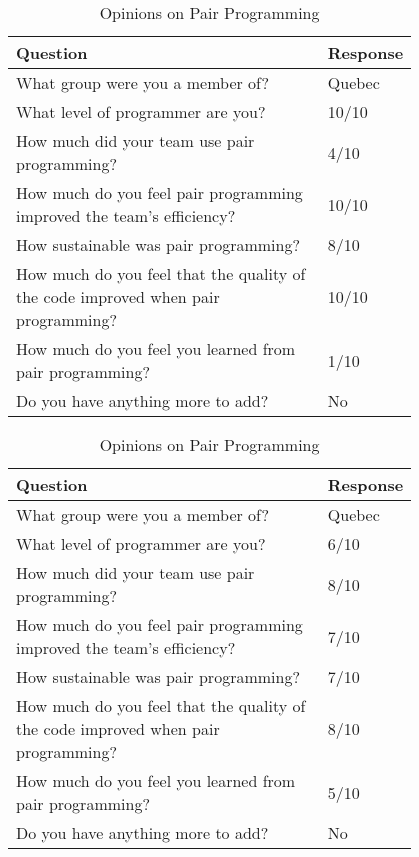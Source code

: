 \documentclass{article}
\begin{document}
\begin{table}[ht]
\centering
\renewcommand{\arraystretch}{1.3}
\caption{Opinions on Pair Programming}
\begin{tabular}{|p{0.8\linewidth}|l|}
\hline
\textbf{Question} & \textbf{Response} \\
\hline
What group were you a member of? & Quebec \\
\hline 
What level of programmer are you? & 10/10\\
\hline 
How much did your team use pair programming? & 4/10\\
\hline 
How much do you feel pair programming improved the team's efficiency? & 10/10\\
\hline 
How sustainable was pair programming? & 8/10\\
\hline 
How much do you feel that the quality of the code improved when pair programming? & 10/10\\
\hline 
How much do you feel you learned from pair programming? & 1/10\\
\hline 
Do you have anything more to add? &  No\\
\hline
\end{tabular}
\end{table}

\begin{table}[ht]
\centering
\renewcommand{\arraystretch}{1.3}
\caption{Opinions on Pair Programming}
\begin{tabular}{|p{0.8\linewidth}|l|}
\hline
\textbf{Question} & \textbf{Response} \\
\hline
What group were you a member of? & Quebec \\
\hline 
What level of programmer are you? & 6/10\\
\hline 
How much did your team use pair programming? & 8/10\\
\hline 
How much do you feel pair programming improved the team's efficiency? & 7/10\\
\hline 
How sustainable was pair programming? & 7/10\\
\hline 
How much do you feel that the quality of the code improved when pair programming? & 8/10\\
\hline 
How much do you feel you learned from pair programming? & 5/10\\
\hline 
Do you have anything more to add? &  No\\
\hline
\end{tabular}
\end{table}
\end{document}
